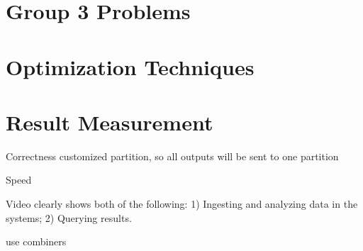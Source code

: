 \documentclass[fontsize=11pt,paper=a4,pagesize=auto]{report}
\begin{document}
\blindtext

\section{Group 3 Problems}
 

\blindtext

\section{Optimization Techniques}
 

\blindtext
 
\section{Result Measurement}
Correctness 
customized partition, so all outputs will be sent to one partition 


Speed 

Video clearly shows both of the following: 1) Ingesting and analyzing data in the systems; 2) Querying results.

use combiners 


 
\end{document}
